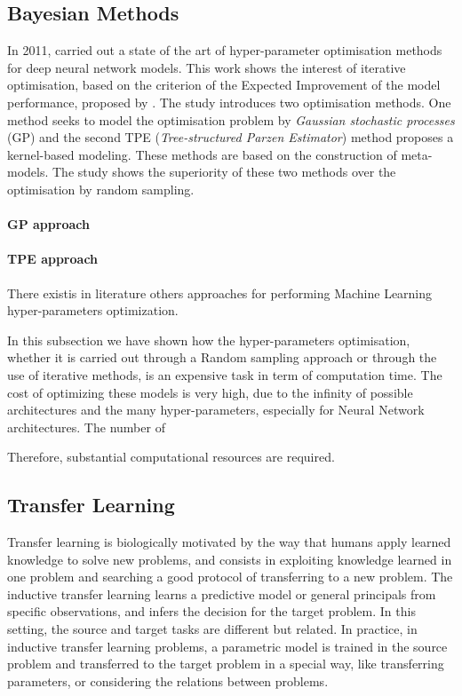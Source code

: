 \subsection{Bayesian Methods}

In 2011, \citep{bergstra2011algorithms} carried out a state of the art of hyper-parameter optimisation methods for deep neural network models. This work shows the interest of iterative optimisation, based on the criterion of the Expected Improvement of the model performance, proposed by \citep{jones2001taxonomy}. The study introduces two optimisation methods. One method seeks to model the optimisation problem by \textit{Gaussian stochastic processes} (GP) and the second TPE (\textit{Tree-structured Parzen Estimator}) method proposes a kernel-based modeling. These methods are based on the construction of meta-models. The study shows the superiority of these two methods over the optimisation by random sampling.

\paragraph{GP approach}

\paragraph{TPE approach} \label{TPE approach}


There existis in literature others approaches for performing Machine Learning hyper-parameters optimization. 


In this subsection we have shown how the hyper-parameters optimisation, whether it is carried out through a Random sampling approach or through the use of iterative methods, is an expensive task in term of computation time. The cost of optimizing these models is very high, due to the inﬁnity of possible architectures and the many hyper-parameters, especially for Neural Network architectures. The number of 

Therefore, substantial computational resources are required.


\subsection{Transfer Learning}

Transfer learning is biologically motivated by the way that humans apply learned knowledge to solve new problems, and consists in exploiting knowledge learned in one problem and searching a good protocol of transferring to a new problem.
The inductive transfer learning learns a predictive model or general principals from specific observations, and infers the decision for the target problem. In this setting, the source and target tasks are different but related. In practice, in inductive transfer learning problems, a parametric model is trained in the source problem and transferred to the target problem in a special way, like transferring parameters, or considering the relations between problems.


